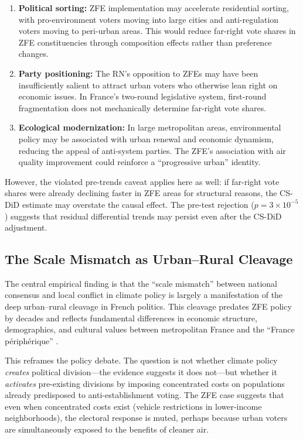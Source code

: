 \documentclass[12pt]{article}
\begin{document}
\begin{enumerate}
\item \textbf{Political sorting:} ZFE implementation may accelerate residential sorting, with pro-environment voters moving into large cities and anti-regulation voters moving to peri-urban areas. This would reduce far-right vote shares in ZFE constituencies through composition effects rather than preference changes.

\item \textbf{Party positioning:} The RN's opposition to ZFEs may have been insufficiently salient to attract urban voters who otherwise lean right on economic issues. In France's two-round legislative system, first-round fragmentation does not mechanically determine far-right vote shares.

\item \textbf{Ecological modernization:} In large metropolitan areas, environmental policy may be associated with urban renewal and economic dynamism, reducing the appeal of anti-system parties. The ZFE's association with air quality improvement could reinforce a ``progressive urban'' identity.
\end{enumerate}

However, the violated pre-trends caveat applies here as well: if far-right vote shares were already declining faster in ZFE areas for structural reasons, the CS-DiD estimate may overstate the causal effect. The pre-test rejection ($p = 3 \times 10^{-5}$) suggests that residual differential trends may persist even after the CS-DiD adjustment.

\subsection{The Scale Mismatch as Urban--Rural Cleavage}

The central empirical finding is that the ``scale mismatch'' between national consensus and local conflict in climate policy is largely a manifestation of the deep urban--rural cleavage in French politics. This cleavage predates ZFE policy by decades and reflects fundamental differences in economic structure, demographics, and cultural values between metropolitan France and the ``France p\'eriph\'erique'' \citep{bergeaud2016growth}.

This reframes the policy debate. The question is not whether climate policy \textit{creates} political division---the evidence suggests it does not---but whether it \textit{activates} pre-existing divisions by imposing concentrated costs on populations already predisposed to anti-establishment voting. The ZFE case suggests that even when concentrated costs exist (vehicle restrictions in lower-income neighborhoods), the electoral response is muted, perhaps because urban voters are simultaneously exposed to the benefits of cleaner air.
\end{document}

